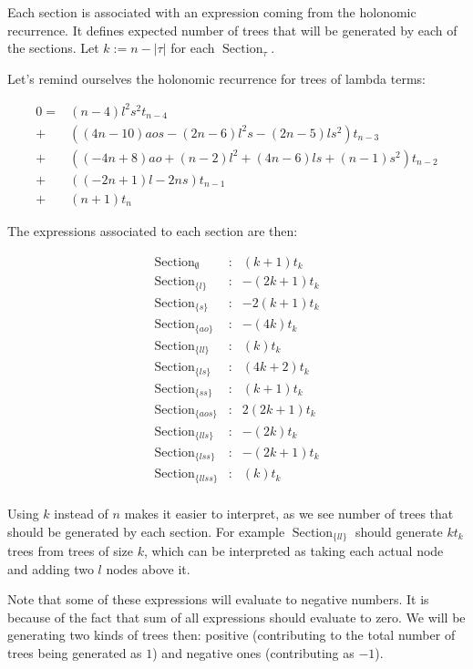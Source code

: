 \documentclass[final]{article}
\theoremstyle{definition}
\theoremstyle{definition}
\theoremstyle{remark}
\DeclareMathOperator{\tSection}{\text{Section}}
\begin{document}
Each section is associated with an expression coming from the holonomic recurrence. It defines expected number of trees that will be generated by each of the sections. Let \(k := n - |\tau|\) for each \(\tSection_\tau\).

Let's remind ourselves the holonomic recurrence for trees of lambda terms:

\[\begin{array}{rl}
        0 =& (n - 4) l^2 s^2 t_{n - 4}\\
        +& ((4 n - 10) a o s - (2 n - 6) l^2 s - (2 n - 5) l s^2) t_{n - 3}\\
        +& ((-4 n + 8) a o + (n - 2) l^2 + (4 n - 6) l s + (n - 1) s^2) t_{n - 2}\\
        +& ((-2 n + 1) l - 2 n s) t_{n - 1}\\
        +& (n + 1) t_{n}
\end{array}\]

The expressions associated to each section are then:

\[\begin{array}{lcr}
        \tSection_{\emptyset} &:& (k + 1) t_k\\
        \tSection_{\{l\}} &:& - (2 k + 1) t_k\\
        \tSection_{\{s\}} &:& - 2 (k + 1) t_k\\
        \tSection_{\{ao\}} &:& - (4 k) t_k\\
        \tSection_{\{ll\}} &:& (k) t_k\\
        \tSection_{\{ls\}} &:& (4 k + 2) t_k\\
        \tSection_{\{ss\}} &:& (k + 1) t_k\\
        \tSection_{\{aos\}} &:& 2 (2 k + 1) t_k\\
        \tSection_{\{lls\}} &:& - (2 k) t_k\\
        \tSection_{\{lss\}} &:& - (2 k + 1) t_k\\
        \tSection_{\{llss\}} &:& (k) t_k\\
\end{array}\]

Using \(k\) instead of \(n\) makes it easier to interpret, as we see number of trees that should be generated by each section. For example \(\tSection_{\{ll\}}\) should generate \(k t_k\) trees from trees of size \(k\), which can be interpreted as taking each actual node and adding two \(l\) nodes above it.

Note that some of these expressions will evaluate to negative numbers. It is because of the fact that sum of all expressions should evaluate to zero. We will be generating two kinds of trees then: positive (contributing to the total number of trees being generated as \(1\)) and negative ones (contributing as \(-1\)).
\end{document}
